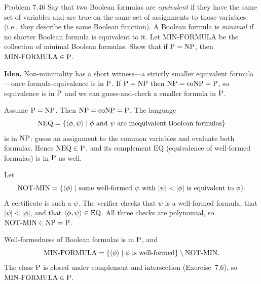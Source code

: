 \begin{question}{Problem 7.46}
Say that two Boolean formulas are \emph{equivalent} if they have the same set of variables and are true on the same set of assignments to those variables (i.e., they describe the same Boolean function). A Boolean formula is \emph{minimal} if no shorter Boolean formula is equivalent to it. Let $\mathrm{MIN\text{-}FORMULA}$ be the collection of minimal Boolean formulas. Show that if $\mathrm{P}=\mathrm{NP}$, then $\mathrm{MIN\text{-}FORMULA}\in\mathrm{P}$.
\end{question}
\begin{soln}
\textbf{Idea.} Non-minimality has a short witness---a strictly smaller equivalent formula---once formula-equivalence is in $\mathrm{P}$. If $\mathrm{P}=\mathrm{NP}$ then $\mathrm{NP}=\mathrm{coNP}=\mathrm{P}$, so equivalence is in $\mathrm{P}$ and we can guess-and-check a smaller formula in $\mathrm{P}$.

Assume $\mathrm{P}=\mathrm{NP}$. Then $\mathrm{NP}=\mathrm{coNP}=\mathrm{P}$. The language
\[
\mathrm{NEQ}=\{\langle \phi,\psi\rangle\mid\phi\text{ and }\psi\text{ are inequivalent Boolean formulas}\}
\]
is in $\mathrm{NP}$: guess an assignment to the common variables and evaluate both formulas. Hence $\mathrm{NEQ}\in\mathrm{P}$, and its complement $\mathrm{EQ}$ (equivalence of well-formed formulas) is in $\mathrm{P}$ as well.

Let
\[
\mathrm{NOT\text{-}MIN}=\{\langle \phi\rangle\mid\text{some well-formed $\psi$ with $\lvert\psi\rvert<\lvert\phi\rvert$ is equivalent to $\phi$}\}.
\]
A certificate is such a $\psi$. The verifier checks that $\psi$ is a well-formed formula, that $\lvert\psi\rvert<\lvert\phi\rvert$, and that $\langle \phi,\psi\rangle\in\mathrm{EQ}$. All three checks are polynomial, so $\mathrm{NOT\text{-}MIN}\in\mathrm{NP}=\mathrm{P}$.

Well-formedness of Boolean formulas is in $\mathrm{P}$, and
\[
\mathrm{MIN\text{-}FORMULA}
=\{\langle \phi\rangle\mid\phi\text{ is well-formed}\}\setminus\mathrm{NOT\text{-}MIN}.
\]
The class $\mathrm{P}$ is closed under complement and intersection (Exercise~7.6), so $\mathrm{MIN\text{-}FORMULA}\in\mathrm{P}$.
\end{soln}

